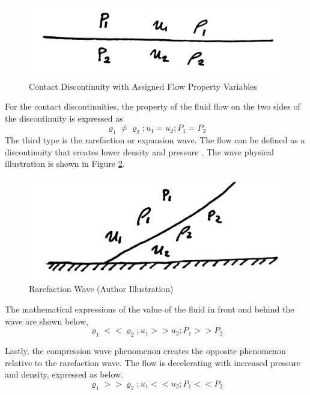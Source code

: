 \documentclass[11pt]{article}
\begin{document}
\begin{figure}[ht]
    \centering
    \includegraphics[width=0.4\linewidth]{Pictures/ContactDisc.jpg}
    \caption{Contact Discontinuity with Assigned Flow Property Variables}
    \label{fig:flowdisc}
\end{figure}

For the contact discontinuities, the property of the fluid flow on the two sides of the discontinuity is expressed as 
\begin{equation*}
    \varrho_1 \ne \varrho_2 ; u_1 = u_2 ; P_1 = P_2
\end{equation*}
The third type is the rarefaction or expansion wave. The flow can be defined as a discontinuity that creates lower density and pressure \citep{AMS2012}. The wave physical illustration is shown in Figure \ref{fig:rarefwave}.

\begin{figure}[ht]
    \centering
    \includegraphics[width=0.4\linewidth]{Pictures/Rarefaction.jpg}
    \caption{Rarefaction Wave (Author Illustration)}
    \label{fig:rarefwave}
\end{figure}

The mathematical expressions of the value of the fluid in front and behind the wave are shown below,
\begin{equation*}
    \varrho_1 << \varrho_2 ; u_1 >> u_2 ; P_1 >> P_2
\end{equation*}

Lastly, the compression wave phenomenon creates the opposite phenomenon relative to the rarefaction wave. The flow is decelerating with increased pressure and density, expressed as below.
\begin{equation*}
    \varrho_1 >> \varrho_2 ; u_1 << u_2 ; P_1 << P_2
\end{equation*}
\end{document}
